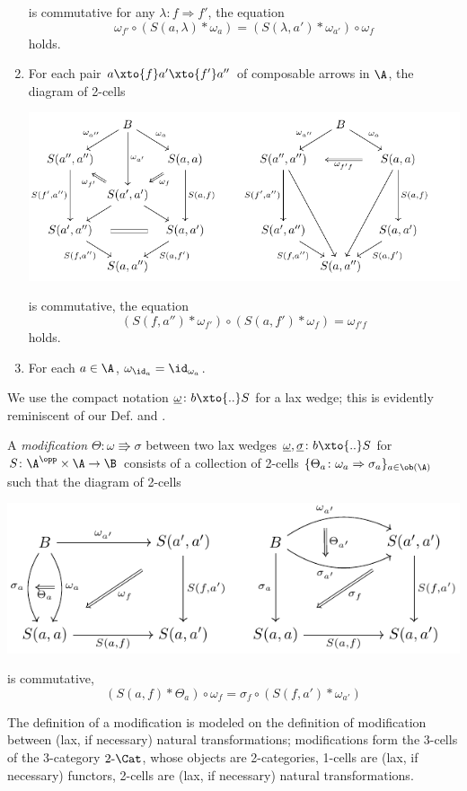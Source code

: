 \begin{definition}
\begin{enumerate}[label=(\oldstylenums{\arabic*})]
is commutative for any $\lambda\colon f\Rightarrow f'$, \ie   the equation
\[
\omega_{f'}\circ (S(a, \lambda)*\omega_a) = (S(\lambda, a') * \omega_{a'})\circ \omega_f
\]
holds.
\item For each pair $a\xto{f}a'\xto{f'}a''$ of composable arrows in $\A$, the diagram of 2-cells
\begin{center}
\includegraphics[scale=1]{figures/fig16}
\end{center}
is commutative, \ie   the equation
\[
(S(f, a'') * \omega_{f'})\circ (S(a, f') * \omega_f) = \omega_{f'f}
\]
holds.
\item For each $a\in\A$, $\omega_{\id_a} = \id_{\omega_a}$.
\end{enumerate}
\end{definition}
\begin{notat}
We use the compact notation $\underline{\omega}\colon b\xto{..}S$ for a lax wedge; this is evidently reminiscent of our Def\@.  and \cite{McL}.
\end{notat}
\begin{definition}[Modification]\label{modification}
A \emph{modification} $\Theta\colon \omega\Rrightarrow\sigma$ between two lax wedges $\underline{\omega},\underline{\sigma}\colon b\xto{..}S$ for $S\colon \A^\opp\times \A \to \B$ consists of a collection of 2-cells $\{ \Theta_a\colon \omega_a\Rightarrow \sigma_a\}_{a\in \ob(\A)}$ such that the diagram of 2-cells
\begin{center}
\includegraphics[scale=1]{figures/fig17}
\end{center}
is commutative, \ie 
\[
(S(a,f) * \Theta_a)\circ \omega_f = \sigma_f \circ (S(f,a') * \omega_{a'})
\]
\end{definition}
The definition of a modification is modeled on the definition of modification between (lax, if necessary) natural transformations; modifications \cite{Bor1} form the 3-cells of the 3-category $2\text{-}\Cat$, whose objects are 2-categories, 1-cells are (lax, if necessary) functors, 2-cells are (lax, if necessary) natural transformations.

